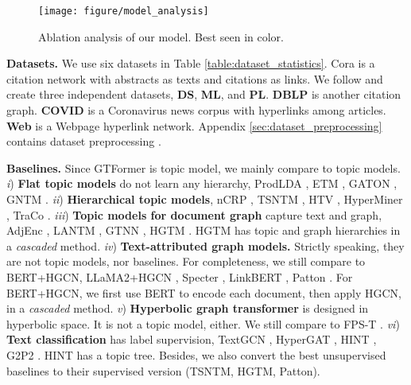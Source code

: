 \begin{figure*}%
	\centering
	\texttt{[image: figure/model\_analysis]}
	\vspace{-0.6cm}
	\caption{Ablation analysis of our model. Best seen in color.}
	\label{fig:model_analysis}
	\vspace{-0.42cm}
\end{figure*}


\textbf{Datasets.} We use six datasets in Table \ref{table:dataset_statistics}. Cora \cite{cora} is a citation network with abstracts as texts and citations as links. We follow \cite{cora2} and create three independent datasets, \textbf{DS}, \textbf{ML}, and \textbf{PL}. \textbf{DBLP} \cite{aminer} is another citation graph. \textbf{COVID} \cite{hgtm} is a Coronavirus news corpus with hyperlinks among articles. \textbf{Web} \cite{web} is a Webpage hyperlink network. Appendix \ref{sec:dataset_preprocessing} contains dataset preprocessing \cite{wu2024topmost}.

\textbf{Baselines.} Since GTFormer is topic model, we mainly compare to topic models. \emph{i}) \textbf{Flat topic models} do not learn any hierarchy, ProdLDA \cite{prodlda}, ETM \cite{etm}, GATON \cite{gaton}, GNTM \cite{gntm}. \emph{ii}) \textbf{Hierarchical topic models}, nCRP \cite{ncrp}, TSNTM \cite{tsntm}, HTV \cite{htv}, HyperMiner \cite{hyperminer}, TraCo \cite{traco}. \emph{iii}) \textbf{Topic models for document graph} capture text and graph, AdjEnc \cite{adjacent_encoder}, LANTM \cite{lantm}, GTNN \cite{gtnn}, HGTM \cite{hgtm}. HGTM has topic and graph hierarchies in a \emph{cascaded} method. \emph{iv}) \textbf{Text-attributed graph models.} %
Strictly speaking, they are not topic models, nor baselines. For completeness, we still compare to BERT+HGCN, LLaMA2+HGCN \cite{llama2}, Specter \cite{specter}, LinkBERT \cite{linkbert}, Patton \cite{patton}. For BERT+HGCN, we first use BERT to encode each document, then apply HGCN, in a \emph{cascaded} method. %
\emph{v}) \textbf{Hyperbolic graph transformer} is designed in hyperbolic space. It is not a topic model, either. We still compare to FPS-T \cite{fps_t}. \emph{vi}) \textbf{Text classification} has label supervision, TextGCN \cite{textgcn}, HyperGAT \cite{hypergat}, HINT \cite{hint}, G2P2 \cite{g2p2}. HINT has a topic tree. Besides, we also convert the best unsupervised baselines to their supervised version (TSNTM, HGTM, Patton).

